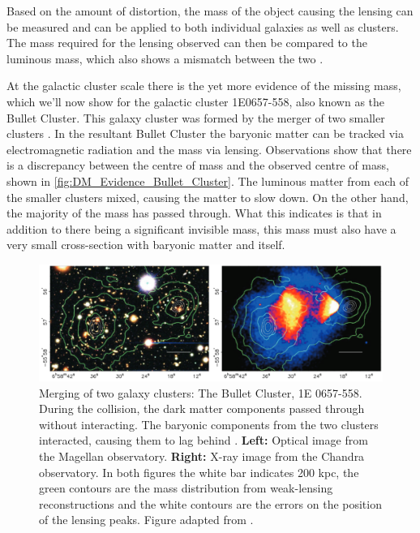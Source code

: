 \par
Based on the amount of distortion, the mass of the object causing the lensing can be measured and can be applied to both individual galaxies as well as clusters.
The mass required for the lensing observed can then be compared to the luminous mass, which also shows a mismatch between the two \cite{History_Of_Dark_Matter_2018_ref}.


\par
At the galactic cluster scale there is the yet more evidence of the missing mass, which we'll now show for the galactic cluster 1E0657-558, also known as the Bullet Cluster.
This galaxy cluster was formed by the merger of two smaller clusters \cite{bullet_cluster_ref}.
In the resultant Bullet Cluster the baryonic matter can be tracked via electromagnetic radiation and the mass via lensing.
Observations show that there is a discrepancy between the centre of mass and the observed centre of mass, shown in \autoref{fig:DM_Evidence_Bullet_Cluster}.
The luminous matter from each of the smaller clusters mixed, causing the matter to slow down.
On the other hand, the majority of the mass has passed through.
What this indicates is that in addition to there being a significant invisible mass, this mass must also have a very small cross-section with baryonic matter and itself.

\begin{figure}%
    \centering
     \includegraphics[width=\textwidth]{Figures/DarkMatterEvidence/bullet_cluster_2.png}
    \caption[Merging of two galaxy cluster, 1E 0657-558]{Merging of two galaxy clusters: The Bullet Cluster, 1E 0657-558.
             During the collision, the dark matter components passed through without interacting.
             The baryonic components from the two clusters interacted, causing them to lag behind .
             \textbf{Left:} Optical image from the Magellan observatory.
             \textbf{Right:} X-ray image from the Chandra observatory.
             In both figures the white bar indicates 200 kpc, the green contours are the mass distribution from weak-lensing reconstructions and the white contours are the errors on the position of the lensing peaks.
             Figure adapted from \cite{bullet_cluster_ref}.}
    \label{fig:DM_Evidence_Bullet_Cluster}
\end{figure}


